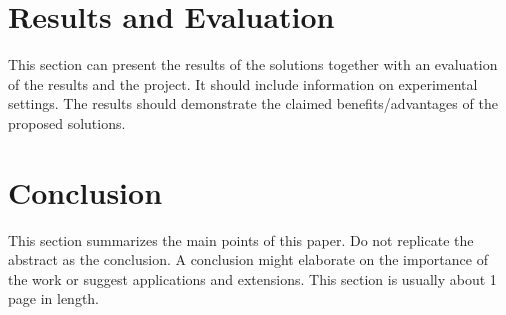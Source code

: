 \documentclass[11pt,a4paper]{article}
\begin{document}
\section{Results and Evaluation}

This section can present the results of the solutions together with an evaluation of the results and the project. It should include information on experimental settings. The results should demonstrate the claimed benefits/advantages of the proposed solutions.

\section{Conclusion}

This section summarizes the main points of this paper. Do not replicate the abstract as the conclusion. A conclusion might elaborate on the importance of the work or suggest applications and extensions. This section is usually about 1 page in length.


\end{document}
